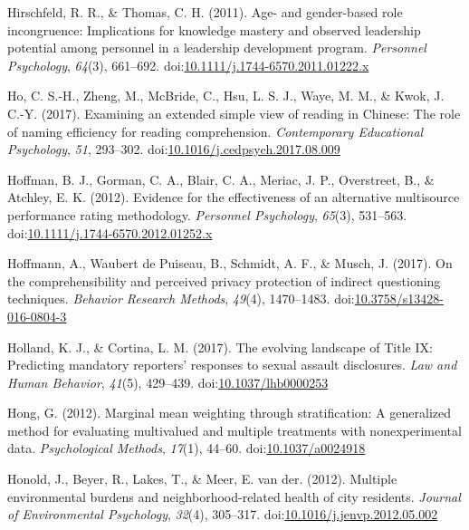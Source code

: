 \documentclass[english,man]{apa6}
\theoremstyle{definition}
\theoremstyle{definition}
\theoremstyle{definition}
\theoremstyle{remark}
\begin{document}
\hypertarget{ref-Hirschfeld2011}{}
Hirschfeld, R. R., \& Thomas, C. H. (2011). Age- and gender-based role
incongruence: Implications for knowledge mastery and observed leadership
potential among personnel in a leadership development program.
\emph{Personnel Psychology}, \emph{64}(3), 661--692.
doi:\href{https://doi.org/10.1111/j.1744-6570.2011.01222.x}{10.1111/j.1744-6570.2011.01222.x}

\hypertarget{ref-Ho2017}{}
Ho, C. S.-H., Zheng, M., McBride, C., Hsu, L. S. J., Waye, M. M., \&
Kwok, J. C.-Y. (2017). Examining an extended simple view of reading in
Chinese: The role of naming efficiency for reading comprehension.
\emph{Contemporary Educational Psychology}, \emph{51}, 293--302.
doi:\href{https://doi.org/10.1016/j.cedpsych.2017.08.009}{10.1016/j.cedpsych.2017.08.009}

\hypertarget{ref-Hoffman2012}{}
Hoffman, B. J., Gorman, C. A., Blair, C. A., Meriac, J. P., Overstreet,
B., \& Atchley, E. K. (2012). Evidence for the effectiveness of an
alternative multisource performance rating methodology. \emph{Personnel
Psychology}, \emph{65}(3), 531--563.
doi:\href{https://doi.org/10.1111/j.1744-6570.2012.01252.x}{10.1111/j.1744-6570.2012.01252.x}

\hypertarget{ref-Hoffmann2016}{}
Hoffmann, A., Waubert de Puiseau, B., Schmidt, A. F., \& Musch, J.
(2017). On the comprehensibility and perceived privacy protection of
indirect questioning techniques. \emph{Behavior Research Methods},
\emph{49}(4), 1470--1483.
doi:\href{https://doi.org/10.3758/s13428-016-0804-3}{10.3758/s13428-016-0804-3}

\hypertarget{ref-Holland2017}{}
Holland, K. J., \& Cortina, L. M. (2017). The evolving landscape of
Title IX: Predicting mandatory reporters' responses to sexual assault
disclosures. \emph{Law and Human Behavior}, \emph{41}(5), 429--439.
doi:\href{https://doi.org/10.1037/lhb0000253}{10.1037/lhb0000253}

\hypertarget{ref-Hong2012}{}
Hong, G. (2012). Marginal mean weighting through stratification: A
generalized method for evaluating multivalued and multiple treatments
with nonexperimental data. \emph{Psychological Methods}, \emph{17}(1),
44--60. doi:\href{https://doi.org/10.1037/a0024918}{10.1037/a0024918}

\hypertarget{ref-Honold2012}{}
Honold, J., Beyer, R., Lakes, T., \& Meer, E. van der. (2012). Multiple
environmental burdens and neighborhood-related health of city residents.
\emph{Journal of Environmental Psychology}, \emph{32}(4), 305--317.
doi:\href{https://doi.org/10.1016/j.jenvp.2012.05.002}{10.1016/j.jenvp.2012.05.002}
\end{document}
